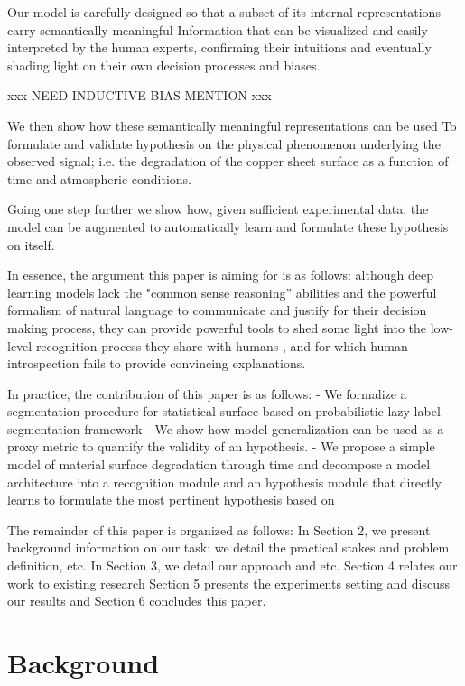 \documentclass[10pt,twocolumn,letterpaper]{article}
\begin{document}
Our model is carefully designed so that a subset of its internal representations carry semantically meaningful 
Information that can be visualized and easily interpreted by the human experts, confirming their intuitions 
and eventually shading light on their own decision processes and biases.

xxx NEED INDUCTIVE BIAS MENTION xxx

We then show how these semantically meaningful representations can be used
To formulate and validate hypothesis on the physical phenomenon underlying the observed signal; 
i.e. the degradation of the copper sheet surface as a function of time and atmospheric conditions.

Going one step further we show how, given sufficient experimental data, the model
can be augmented to automatically learn and formulate these hypothesis on itself.

In essence, the argument this paper is aiming for is as follows: although deep learning models 
lack the "common sense reasoning” abilities and the powerful formalism of natural language to communicate 
and justify for their decision making process, they can provide powerful tools to shed some light into the low-level
recognition process they share with humans \cite{xxx}, and for which human introspection fails to provide convincing explanations.

In practice, the contribution of this paper is as follows:
- We formalize a segmentation procedure for statistical surface based on probabilistic lazy label segmentation framework
- We show how model generalization can be used as a proxy metric to quantify the validity of an hypothesis.
- We propose a simple model of material surface degradation through time and decompose a model architecture
into a recognition module and an hypothesis module that directly learns to formulate the most pertinent hypothesis based on 

The remainder of this paper is organized as follows:
In Section 2, we present background information on our task: we detail the practical stakes and problem definition, etc.
In Section 3, we detail our approach and etc.
Section 4 relates our work to existing research
Section 5 presents the experiments setting and discuss our results and Section 6 concludes this paper.


\section{Background}
\end{document}
